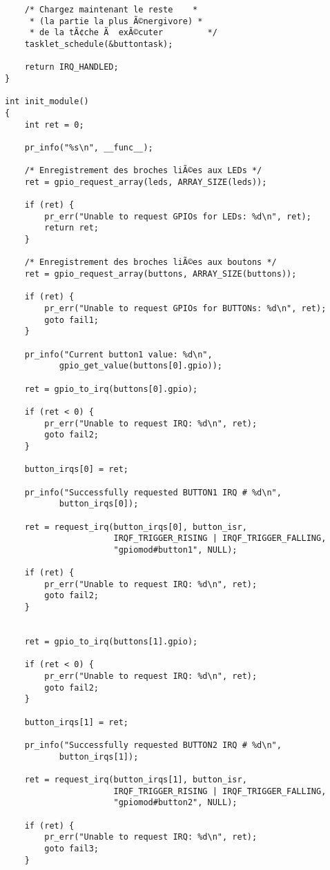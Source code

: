 \documentclass[11pt]{article}
\begin{document}
\begin{verbatim}
    /* Chargez maintenant le reste    *
     * (la partie la plus Ã©nergivore) *
     * de la tÃ¢che Ã  exÃ©cuter         */
    tasklet_schedule(&buttontask);

    return IRQ_HANDLED;
}

int init_module()
{
    int ret = 0;

    pr_info("%s\n", __func__);

    /* Enregistrement des broches liÃ©es aux LEDs */
    ret = gpio_request_array(leds, ARRAY_SIZE(leds));

    if (ret) {
        pr_err("Unable to request GPIOs for LEDs: %d\n", ret);
        return ret;
    }

    /* Enregistrement des broches liÃ©es aux boutons */
    ret = gpio_request_array(buttons, ARRAY_SIZE(buttons));

    if (ret) {
        pr_err("Unable to request GPIOs for BUTTONs: %d\n", ret);
        goto fail1;
    }

    pr_info("Current button1 value: %d\n",
           gpio_get_value(buttons[0].gpio));

    ret = gpio_to_irq(buttons[0].gpio);

    if (ret < 0) {
        pr_err("Unable to request IRQ: %d\n", ret);
        goto fail2;
    }

    button_irqs[0] = ret;

    pr_info("Successfully requested BUTTON1 IRQ # %d\n",
           button_irqs[0]);

    ret = request_irq(button_irqs[0], button_isr,
                      IRQF_TRIGGER_RISING | IRQF_TRIGGER_FALLING,
                      "gpiomod#button1", NULL);

    if (ret) {
        pr_err("Unable to request IRQ: %d\n", ret);
        goto fail2;
    }


    ret = gpio_to_irq(buttons[1].gpio);

    if (ret < 0) {
        pr_err("Unable to request IRQ: %d\n", ret);
        goto fail2;
    }

    button_irqs[1] = ret;

    pr_info("Successfully requested BUTTON2 IRQ # %d\n",
           button_irqs[1]);

    ret = request_irq(button_irqs[1], button_isr,
                      IRQF_TRIGGER_RISING | IRQF_TRIGGER_FALLING,
                      "gpiomod#button2", NULL);

    if (ret) {
        pr_err("Unable to request IRQ: %d\n", ret);
        goto fail3;
    }


\end{verbatim}
\end{document}
